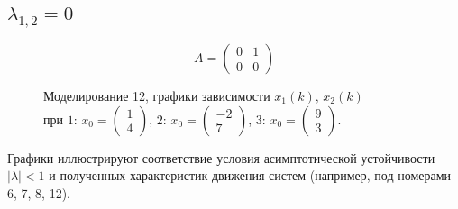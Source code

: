 \documentclass[a5paper, 10pt]{article}
\theoremstyle{definition}
\theoremstyle{plain}
\theoremstyle{remark}
\begin{document}
\subsection{$\lambda_{1, 2} = 0$}
\begin{equation}
A =
\begin{pmatrix}
 0 &  1  \\
0 & 0
\end{pmatrix}
\end{equation}
\begin{figure}[h!]
\caption{Моделирование 12, графики зависимости $x_1 \left( k \right), \, x_2 \left( k \right)$ \\ при  $1: \, x_0 = \begin{pmatrix} 1 \\ 4 \end{pmatrix}$, $2: \, x_0 = \begin{pmatrix} -2 \\ 7 \end{pmatrix}$, $3: \, x_0 = \begin{pmatrix} 9 \\ 3 \end{pmatrix}$.}
\end{figure}

Графики иллюстрируют соответствие условия асимптотической устойчивости $ \left| \lambda \right| < 1$ и полученных характеристик движения систем (например, под номерами 6, 7, 8, 12).
\end{document}
